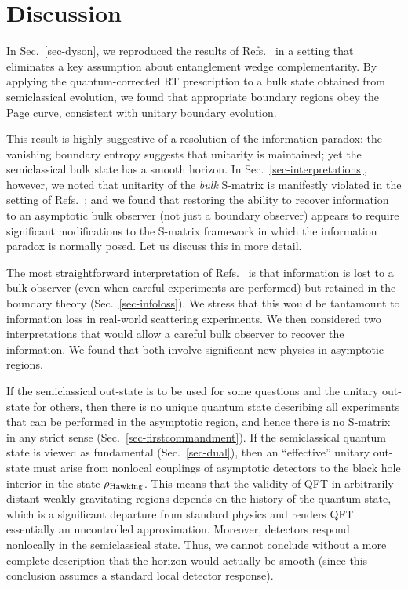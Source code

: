 \documentclass[12pt,letterpaper]{article}
\begin{document}
\section{Discussion}
\label{sec-discussion}

In Sec.~\ref{sec-dyson}, we reproduced the results of Refs.~\cite{Pen19,AEMM} in a setting that eliminates a key assumption about entanglement wedge complementarity. By applying the quantum-corrected RT prescription to a bulk state obtained from semiclassical evolution, we found that appropriate boundary regions obey the Page curve, consistent with unitary boundary evolution.

This result is highly suggestive of a resolution of the information paradox: the vanishing boundary entropy suggests that unitarity is maintained; yet the semiclassical bulk state has a smooth horizon. In Sec.~\ref{sec-interpretations}, however, we noted that unitarity of the {\em bulk\/} S-matrix is manifestly violated in the setting of Refs.~\cite{Pen19,AEMM}; and we found that restoring the ability to recover information to an asymptotic bulk observer (not just a boundary observer) appears to require significant modifications to the S-matrix framework in which the information paradox is normally posed. Let us discuss this in more detail.

The most straightforward interpretation of Refs.~\cite{Pen19,AEMM} is that information is lost to a bulk observer (even when careful experiments are performed) but retained in the boundary theory (Sec.~\ref{sec-infoloss}). We stress that this would be tantamount to information loss in real-world scattering experiments. We then considered two interpretations that would allow a careful bulk observer to recover the information. We found that both involve significant new physics in asymptotic regions.

If the semiclassical out-state is to be used for some questions and the unitary out-state for others, then there is no unique quantum state describing all experiments that can be performed in the asymptotic region, and hence there is no S-matrix in any strict sense (Sec.~\ref{sec-firstcommandment}). If the semiclassical quantum state is viewed as fundamental (Sec.~\ref{sec-dual}), then an ``effective'' unitary out-state must arise from nonlocal couplings of asymptotic detectors to the black hole interior in the state $\rho_{\rm Hawking}$. This means that the validity of QFT in arbitrarily distant weakly gravitating regions depends on the history of the quantum state, which is a significant departure from standard physics and renders QFT essentially an uncontrolled approximation. Moreover, detectors respond nonlocally in the semiclassical state. Thus, we cannot conclude without a more complete description that the horizon would actually be smooth (since this conclusion assumes a standard local detector response).
\end{document}
